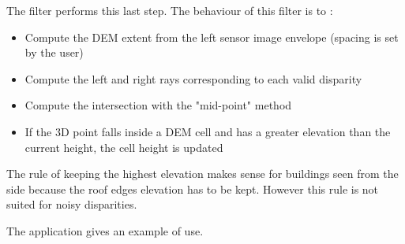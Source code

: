 The filter  performs this last step. The behaviour
of this filter is to :
\begin{itemize}
\item Compute the DEM extent from the left sensor image envelope (spacing is set by the user)
\item Compute the left and right rays corresponding to each valid disparity
\item Compute the intersection with the "mid-point" method
\item If the 3D point falls inside a DEM cell and has a greater elevation than the 
current height, the cell height is updated
\end{itemize}
The rule of keeping the highest elevation makes sense for buildings seen from the side 
because the roof edges elevation has to be kept. However this rule is not suited for 
noisy disparities. 

The application  gives an example of use.

